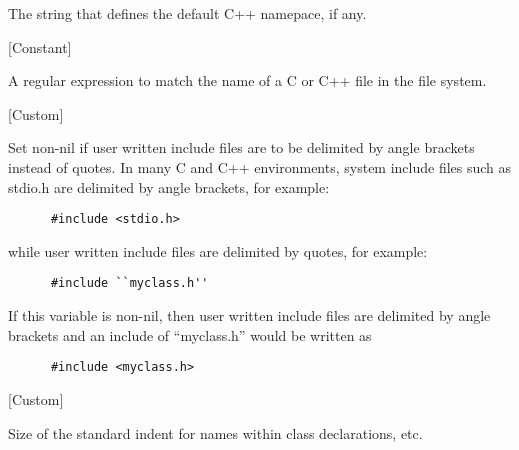 \begin{doc-string}
The string that defines the default C++ namepace, if any.
\end{doc-string}

\vspace{1em}
\noindent
{}
\usebox{\funcname}
 \hfill [Constant]

\begin{doc-string}
A regular expression to match the name of a C or C++ file in the file system.
\end{doc-string}

\vspace{1em}
\noindent
{}
\usebox{\funcname}
 \hfill [Custom]

\begin{doc-string}
Set non-nil if user written include files are to be delimited by
angle brackets instead of quotes.
In many C and C++ environments, system include files such as stdio.h are delimited
by angle brackets, for example:

\small{\begin{verbatim}
      #include <stdio.h>
\end{verbatim}}

while user written include files are delimited by quotes, for example:

\small{\begin{verbatim}
      #include ``myclass.h''
\end{verbatim}}

If this variable is non-nil, then user written include files are delimited
by angle brackets and an include of ``myclass.h'' would be written as

\small{\begin{verbatim}
      #include <myclass.h>
\end{verbatim}}
\end{doc-string}

\vspace{1em}
\noindent
{}
\usebox{\funcname}
 \hfill [Custom]

\begin{doc-string}
Size of the standard indent for names within class declarations, etc.
\end{doc-string}

